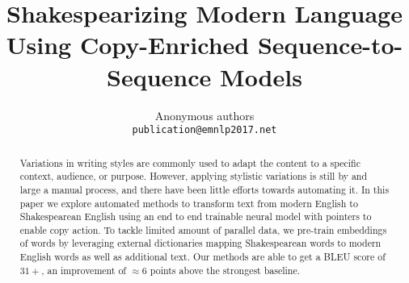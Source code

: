 \documentclass[11pt,letterpaper]{article}
\title{Shakespearizing Modern Language Using Copy-Enriched Sequence-to-Sequence Models}
\author{Anonymous authors \\
  {\tt publication@emnlp2017.net}}
\date{}
\begin{document}
\maketitle

\begin{abstract}
Variations in writing styles are commonly used to adapt the content to a specific context, audience, or purpose. However, applying stylistic variations is still by and large a manual process, and there have been little efforts towards automating it. In this paper we explore automated methods to transform text from modern English to Shakespearean English using an end to end trainable neural model with pointers to enable copy action. To tackle limited amount of parallel data, we pre-train embeddings of words by leveraging external dictionaries mapping Shakespearean words to modern English words as well as additional text. Our methods are able to get a BLEU score of $31+$, an improvement of $\approx6$ points above the strongest baseline.

\end{abstract}













\end{document}
